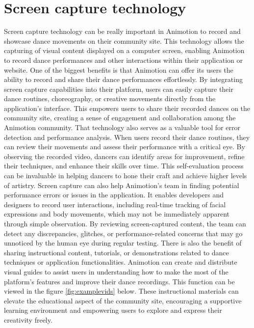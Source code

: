 \section{Screen capture technology}
Screen capture technology can be really important in Animotion to record and showcase dance movements on their 
community site. This technology allows the capturing of visual content displayed on a computer screen, enabling Animotion to 
record dance performances and other interactions within their application or website. One of the biggest benefits is that Animotion can offer
its users the ability to record and share their dance performances effortlessly. 
By integrating screen capture capabilities into their platform, users can easily capture their dance routines, choreography, or creative 
movements directly from the application's interface. This empowers users to share their recorded dances on the community site, creating a 
sense of engagement and collaboration among the Animotion community. That technology also serves as a valuable tool for error 
detection and performance analysis. When users record their dance routines, they can review their movements and assess their 
performance with a critical eye. By observing the recorded video, dancers can identify areas for improvement, refine their 
techniques, and enhance their skills over time. This self-evaluation process can be invaluable in helping dancers to 
hone their craft and achieve higher levels of artistry. Screen capture can also help Animotion's team in finding potential 
performance errors or issues in the application. It enables developers and designers to record user interactions, including real-time 
tracking of facial expressions and body movements, which may not be immediately apparent through simple observation. By reviewing screen-captured 
content, the team can detect any discrepancies, glitches, or performance-related concerns that may go unnoticed by the human eye during regular testing.
There is also the benefit of sharing instructional content, tutorials, or demonstrations related to dance techniques or 
application functionalities. Animotion can create and distribute visual guides to assist users in understanding how to make the most of the 
platform's features and improve their dance recordings. This function can be viewed in the figure \ref{fig:examplevids} below. These instructional materials can elevate 
the educational aspect of the community site, encouraging a supportive learning environment and empowering users to explore and express their creativity freely.


